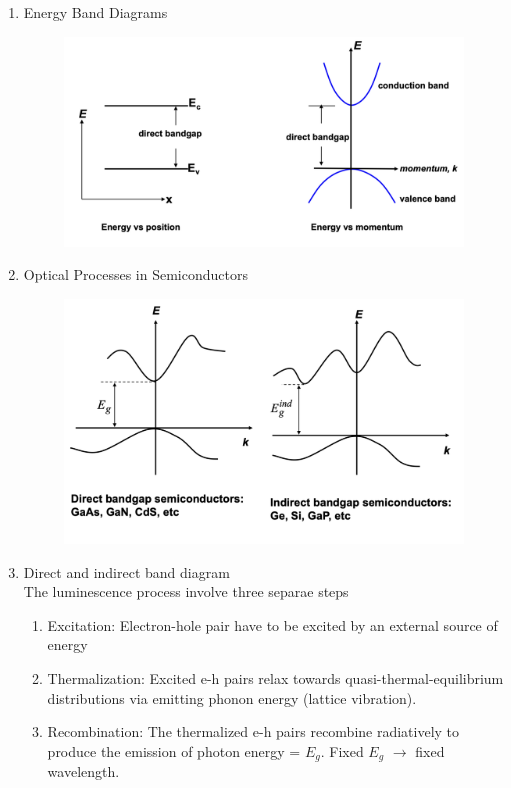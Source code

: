 \begin{enumerate}
\begin{table}[h!]
\begin{tabular}{lc}
        \bottomrule
      \end{tabular}
    \end{table}
    \newpage
    \item Energy Band Diagrams \\
    \begin{figure}[h]
        \centering
        \includegraphics[width=0.75\linewidth]{image/bandgapdiagram.png}
    \end{figure}
    \item Optical Processes in Semiconductors
    \begin{figure}[h]
        \centering
        \includegraphics[width=0.75\linewidth]{image/opticalprocesssemincon.png}
    \end{figure}
    \item Direct and indirect band diagram\\
    The luminescence process involve three separae steps
    \begin{enumerate}
        \item Excitation: Electron-hole pair have to be excited by an external source of energy
        \item Thermalization: Excited e-h pairs relax towards quasi-thermal-equilibrium distributions via emitting phonon energy (lattice vibration).
        \item Recombination: The thermalized e-h pairs recombine radiatively to produce the emission of photon energy = $E_g$. Fixed $E_g$ $\rightarrow$ fixed wavelength.

\end{enumerate}
\end{enumerate}
